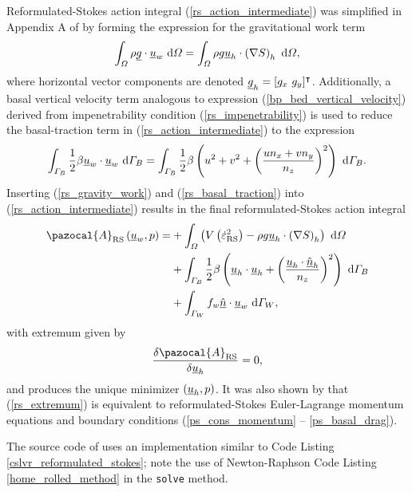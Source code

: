 Reformulated-Stokes action integral (\ref{rs_action_intermediate}) was simplified in Appendix A of \citet{dukowicz_2012} by forming the expression for the gravitational work term
\begin{align}
  \label{rs_gravity_work}
  \int_{\varOmega} \rho \underline{g} \cdot \underline{u}_w \ \mathrm{d}\varOmega = \int_{\varOmega} \rho g \underline{u}_h \cdot \left( \nabla S \right)_h \ \mathrm{d}\varOmega,
\end{align}
where horizontal vector components are denoted $\underline{g}_h = [g_x\ g_y]^\intercal$.  Additionally, a basal vertical velocity term analogous to expression (\ref{bp_bed_vertical_velocity}) derived from impenetrability condition (\ref{rs_impenetrability}) is used to reduce the basal-traction term in (\ref{rs_action_intermediate}) to the expression
{\footnotesize
\begin{align}
  \label{rs_basal_traction}
  \int_{\varGamma_B} \frac{1}{2} \beta \underline{u}_w \cdot \underline{u}_w \ \mathrm{d}\varGamma_B = \int_{\varGamma_B} \frac{1}{2} \beta \left( u^2 + v^2 + \left( \frac{u n_x + v n_y}{n_z} \right)^2 \right) \ \mathrm{d}\varGamma_B.
\end{align}}
Inserting (\ref{rs_gravity_work}) and (\ref{rs_basal_traction}) into (\ref{rs_action_intermediate}) results in the final reformulated-Stokes action integral
\begin{align}
  \label{rs_action}
  \pazocal{A}_{\text{RS}} \left(\rankone{u}_w, p\right) = &+ \int_{\Omega} \left( V\left( \dot{\varepsilon}_{\text{RS}}^2 \right) - \rho g \rankone{u}_h \cdot \left( \nabla S \right)_h \right) \d{\Omega} \notag \\
  &+ \int_{\Gamma_B} \frac{1}{2} \beta \left( \rankone{u}_h \cdot \rankone{u}_h + \left( \frac{\rankone{u}_h \cdot \normal_h}{n_z} \right)^2 \right) \d{\Gamma_B} \notag \\
  &+ \int_{\Gamma_W} f_w \normal \cdot \rankone{u}_w \d{\Gamma_W},
\end{align}
with extremum given by
\begin{align}
  \label{rs_extremum}
  \frac{\delta \pazocal{A}_{\text{RS}}}{\delta \rankone{u}_h} = 0,
\end{align}
and produces the unique minimizer $(\underline{u}_h, p)$.  It was also shown by \citet{dukowicz_2012} that (\ref{rs_extremum}) is equivalent to reformulated-Stokes Euler-Lagrange momentum equations and boundary conditions (\ref{ps_cons_momentum} -- \ref{ps_basal_drag}).

The source code of \CSLVR uses an implementation similar to Code Listing \ref{cslvr_reformulated_stokes}; note the use of Newton-Raphson Code Listing \ref{home_rolled_method} in the \texttt{solve} method.

